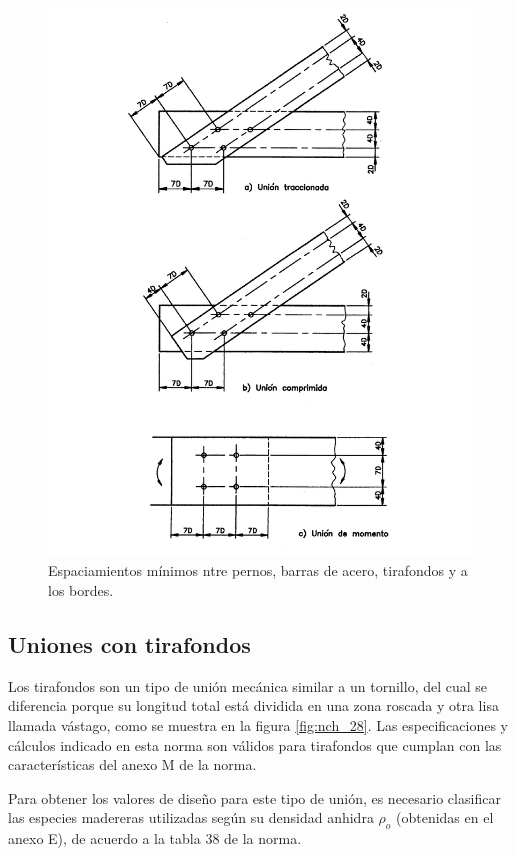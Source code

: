 \begin{figure}[p]
\centering
\includegraphics[width=1\linewidth, angle=1,origin=c]{Imagenes/figura_26.pdf}%
\caption{Espaciamientos mínimos ntre pernos, barras de acero, tirafondos y a los bordes. \cite{nch1198}}
\label{fig:nch_26}
\end{figure}

\subsection{Uniones con tirafondos}
\label{sec:tirafondos}
Los tirafondos son un tipo de unión mecánica similar a un tornillo, del cual se diferencia porque su longitud total está dividida en una zona roscada y otra lisa llamada vástago, como se muestra en la figura \ref{fig:nch_28}. Las especificaciones y cálculos indicado en esta norma son válidos para tirafondos que cumplan con las características del anexo M de la norma.

Para obtener los valores de diseño para este tipo de unión, es necesario clasificar las especies madereras utilizadas según su densidad anhidra $\rho_o$ (obtenidas en el anexo E), de acuerdo a la tabla 38 de la norma.

